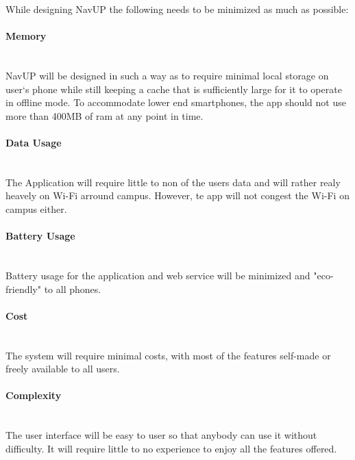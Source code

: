 While designing NavUP the following needs to be minimized as much as possible:


\paragraph{Memory}
\mbox{}\\
NavUP will be designed in such a way as to require minimal local storage on user`s phone while still keeping a cache that is sufficiently large for it to operate in offline mode. To accommodate lower end smartphones, the app should not use more than 400MB of ram at any point in time.

\paragraph{Data Usage}
\mbox{}\\
The Application will require little to non of the users data and will rather realy heavely on Wi-Fi arround campus. However, te app will not congest the Wi-Fi on campus either.

\paragraph{Battery Usage}
\mbox{}\\
Battery usage for the application and web service will be minimized and "eco-friendly" to all phones.

\paragraph{Cost}
\mbox{}\\
The system will require minimal costs, with most of the features self-made or freely available to all users.

\paragraph{Complexity}
\mbox{}\\
The user interface will be easy to user so that anybody can use it without difficulty. 
It will require little to no experience to enjoy all the features offered.

